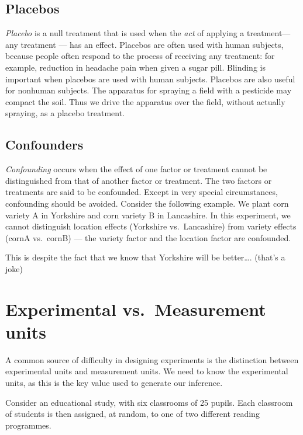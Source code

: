 \documentclass[
]{book}
\begin{document}
\hypertarget{placebos}{%
\subsection{Placebos}\label{placebos}}

\emph{Placebo} is a null treatment that is used when the \emph{act} of applying a treatment--- any treatment --- has an effect. Placebos are often used with human subjects, because people often respond to the process of receiving any treatment: for example,
reduction in headache pain when given a sugar pill. Blinding is important when placebos are used with human subjects. Placebos are also useful for nonhuman subjects. The apparatus for spraying a field with a pesticide may compact the soil. Thus we drive the apparatus over the field, without actually spraying, as a placebo treatment.

\hypertarget{confounders}{%
\subsection{Confounders}\label{confounders}}

\emph{Confounding} occurs when the effect of one factor or treatment cannot be distinguished from that of another factor or treatment. The two factors or treatments are said to be confounded. Except in very special circumstances, confounding should be avoided. Consider the following example. We plant corn variety A in Yorkshire and corn variety B in Lancashire. In this experiment, we cannot distinguish location effects (Yorkshire vs.~Lancashire) from variety effects (cornA vs.~cornB) --- the variety factor and the location factor are confounded.

This is despite the fact that we know that Yorkshire will be better\ldots. (that's a joke)

\hypertarget{experimental-vs.-measurement-units}{%
\section{Experimental vs.~Measurement units}\label{experimental-vs.-measurement-units}}

A common source of difficulty in designing experiments is the distinction between experimental units and measurement units. We need to know the experimental units, as this is the key value used to generate our inference.

Consider an educational study, with six classrooms of 25 pupils. Each classroom of students is then assigned, at random, to one of two different reading programmes.
\end{document}
